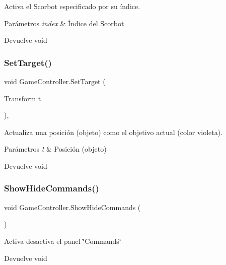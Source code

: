 Activa el Scorbot especificado por su índice. 
\begin{DoxyParams}{Parámetros}
{\em index} & Índice del Scorbot \\
\hline
\end{DoxyParams}
\begin{DoxyReturn}{Devuelve}
void 
\end{DoxyReturn}
\mbox{\label{class_game_controller_af33ac3595c0cdcd615cf63738638482f}} 
\subsubsection{\texorpdfstring{SetTarget()}{SetTarget()}}
{\footnotesize\ttfamily void Game\+Controller.\+Set\+Target (\begin{DoxyParamCaption}\item[{Transform}]{t }\end{DoxyParamCaption})\hspace{0.3cm}{\ttfamily [inline]}, {\ttfamily [private]}}

Actualiza una posición (objeto) como el objetivo actual (color violeta). 
\begin{DoxyParams}{Parámetros}
{\em t} & Posición (objeto) \\
\hline
\end{DoxyParams}
\begin{DoxyReturn}{Devuelve}
void 
\end{DoxyReturn}
\mbox{\label{class_game_controller_a473137527a8eb571f745ba44752e0a79}} 
\subsubsection{\texorpdfstring{ShowHideCommands()}{ShowHideCommands()}}
{\footnotesize\ttfamily void Game\+Controller.\+Show\+Hide\+Commands (\begin{DoxyParamCaption}{ }\end{DoxyParamCaption})\hspace{0.3cm}{\ttfamily [inline]}}

Activa desactiva el panel \char`\"{}\+Commands\char`\"{} \begin{DoxyReturn}{Devuelve}
void 
\end{DoxyReturn}
\mbox{\label{class_game_controller_ad037a03af50093f97a244acb6ee7cfb5}} 
